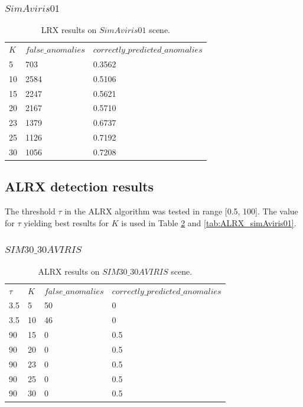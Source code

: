 \subsubsection{$SimAviris01$}
 \begin{table}[H]
\centering
 \resizebox{0.9\textwidth}{!}
{\begin{tabular}{l|l|l}
\textbf{$K$} & $false\_anomalies$ & $correctly\_predicted\_anomalies$\\
5 & 703&0.3562 \\
10 &2584 &0.5106 \\
15 & 2247&0.5621 \\
20 & 2167&0.5710 \\
23 & 1379&0.6737 \\
25 & 1126&0.7192 \\
30 &1056 &0.7208 \\

\end{tabular}}
\caption{LRX results on $SimAviris01$ scene.}
\label{tab:LRX_sim_avirirs01}
\end{table}


\subsection{ALRX detection results}
The threshold $\tau$ in the ALRX algorithm was tested in range [0.5, 100]. The value for $\tau$ yielding best results for $K$ is used in Table \ref{tab:ALRX_simAviris30_30} and \ref{tab:ALRX_simAviris01}. 


\subsubsection{$SIM30\_30AVIRIS$}

 \begin{table}[H]
\centering
 \resizebox{0.9\textwidth}{!}
{\begin{tabular}{l|l|l|l}
\textbf{$\tau$} &\textbf{$K$} & $false\_anomalies$ & $correctly\_predicted\_anomalies$\\
3.5&5 &50 & 0 \\
3.5&10 &46 &0 \\
90&15 & 0&0.5 \\
90&20 & 0&0.5 \\
90&23&0&0.5\\
90&25 &0 &0.5\\
90&30 & 0&0.5 \\

\end{tabular}}
\caption{ALRX results on $SIM30\_30AVIRIS$ scene.}
\label{tab:ALRX_simAviris30_30}
\end{table}



